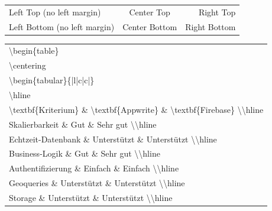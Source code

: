 \begin{tabular}{|@{Row:}l|c||r|}
    Left Top (no left margin)    & Center Top    & Right Top    \\
    Left Bottom (no left margin) & Center Bottom & Right Bottom
\end{tabular}
\begin{table}[]
    \begin{tabular}{l}
        \textbackslash{}begin\{table\}                                                                                                                                \\
        \textbackslash{}centering                                                                                                                                     \\
        \textbackslash{}begin\{tabular\}\{|l|c|c|\}                                                                                                                   \\
        \textbackslash{}hline                                                                                                                                         \\
        \textbackslash{}textbf\{Kriterium\} \& \textbackslash{}textbf\{Appwrite\}          \& \textbackslash{}textbf\{Firebase\} \textbackslash \textbackslash{}hline \\
        Skalierbarkeit     \& Gut                        \& Sehr gut \textbackslash \textbackslash{}hline                                                             \\
        Echtzeit-Datenbank \& Unterstützt                \& Unterstützt \textbackslash \textbackslash{}hline                                                          \\
        Business-Logik     \& Gut                        \& Sehr gut \textbackslash \textbackslash{}hline                                                             \\
        Authentifizierung  \& Einfach                    \& Einfach \textbackslash \textbackslash{}hline                                                              \\
        Geoqueries         \& Unterstützt                \& Unterstützt \textbackslash \textbackslash{}hline                                                          \\
        Storage            \& Unterstützt                \& Unterstützt \textbackslash \textbackslash{}hline                                                          \\

\end{tabular}
\end{table}
